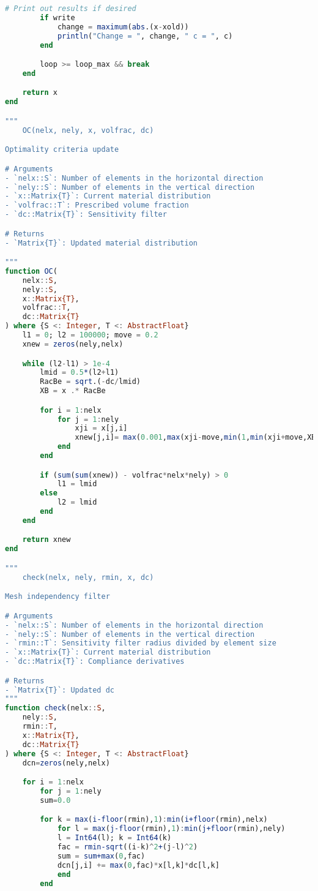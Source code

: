 \begin{lstlisting}[language=Julia, title=\texttt{toph.jl}]
        # Print out results if desired
        if write
            change = maximum(abs.(x-xold))
            println("Change = ", change, " c = ", c)
        end

        loop >= loop_max && break
    end

    return x
end

"""
    OC(nelx, nely, x, volfrac, dc)

Optimality criteria update

# Arguments
- `nelx::S`: Number of elements in the horizontal direction
- `nely::S`: Number of elements in the vertical direction
- `x::Matrix{T}`: Current material distribution
- `volfrac::T`: Prescribed volume fraction
- `dc::Matrix{T}`: Sensitivity filter

# Returns
- `Matrix{T}`: Updated material distribution

"""
function OC(
    nelx::S,
    nely::S,
    x::Matrix{T},
    volfrac::T,
    dc::Matrix{T}
) where {S <: Integer, T <: AbstractFloat}
    l1 = 0; l2 = 100000; move = 0.2
    xnew = zeros(nely,nelx)

    while (l2-l1) > 1e-4
        lmid = 0.5*(l2+l1)
        RacBe = sqrt.(-dc/lmid)
        XB = x .* RacBe

        for i = 1:nelx
            for j = 1:nely
                xji = x[j,i]
                xnew[j,i]= max(0.001,max(xji-move,min(1,min(xji+move,XB[j,i]))))
            end
        end

        if (sum(sum(xnew)) - volfrac*nelx*nely) > 0
            l1 = lmid
        else
            l2 = lmid
        end
    end

    return xnew
end

"""
    check(nelx, nely, rmin, x, dc)

Mesh independency filter

# Arguments
- `nelx::S`: Number of elements in the horizontal direction
- `nely::S`: Number of elements in the vertical direction
- `rmin::T`: Sensitivity filter radius divided by element size
- `x::Matrix{T}`: Current material distribution
- `dc::Matrix{T}`: Compliance derivatives

# Returns
- `Matrix{T}`: Updated dc
"""
function check(nelx::S,
    nely::S,
    rmin::T,
    x::Matrix{T},
    dc::Matrix{T}
) where {S <: Integer, T <: AbstractFloat}
    dcn=zeros(nely,nelx)

    for i = 1:nelx
        for j = 1:nely
        sum=0.0

        for k = max(i-floor(rmin),1):min(i+floor(rmin),nelx)
            for l = max(j-floor(rmin),1):min(j+floor(rmin),nely)
            l = Int64(l); k = Int64(k)
            fac = rmin-sqrt((i-k)^2+(j-l)^2)
            sum = sum+max(0,fac)
            dcn[j,i] += max(0,fac)*x[l,k]*dc[l,k]
            end
        end


\end{lstlisting}
